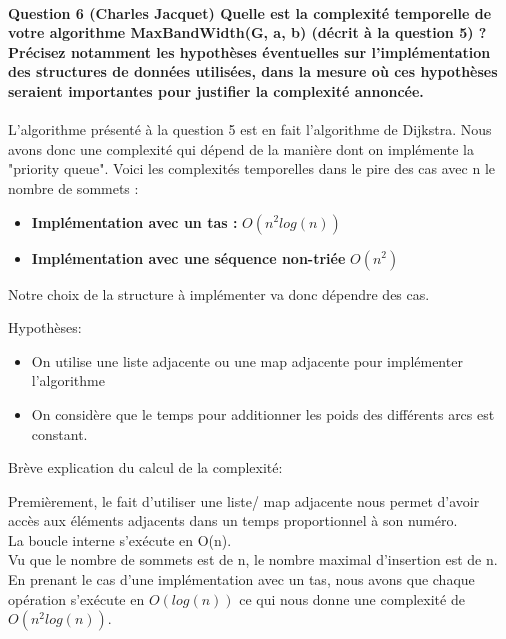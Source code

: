 \documentclass[a4paper]{article}
\begin{document}
\paragraph{Question 6 (Charles Jacquet) Quelle est la complexité temporelle de votre algorithme MaxBandWidth(G, a, b) (décrit à la question 5) ? Précisez notamment les hypothèses éventuelles sur l’implémentation des structures de données utilisées, dans la mesure où ces hypothèses seraient importantes pour justifier la complexité annoncée.}
L'algorithme présenté à la question 5 est en fait l'algorithme de Dijkstra. Nous avons donc une complexité qui dépend de la manière dont on implémente la "priority queue". Voici les complexités temporelles dans le pire des cas avec n le nombre de sommets : \\
\begin{itemize}
\item \textbf{Implémentation avec un tas : } $O(n^2 log(n))$
\item \textbf{Implémentation avec une séquence non-triée} $O(n^2)$
\end{itemize}

Notre choix de la structure à implémenter va donc dépendre des cas.

Hypothèses:
\begin{itemize}
\item On utilise une liste adjacente ou une map adjacente pour implémenter l'algorithme
\item On considère que le temps pour additionner les poids des différents arcs est constant.
\end{itemize}

Brève explication du calcul de la complexité:

Premièrement, le fait d'utiliser une liste/ map adjacente nous permet d'avoir accès aux éléments adjacents dans un temps proportionnel à son numéro.\\
La boucle interne s'exécute en O(n).\\
Vu que le nombre de sommets est de n, le nombre maximal d'insertion est de n.\\
En prenant le cas d'une implémentation avec un tas, nous avons que chaque opération s'exécute en $O(log(n))$ ce qui nous donne une complexité de $O(n^2 log(n))$.
\end{document}
